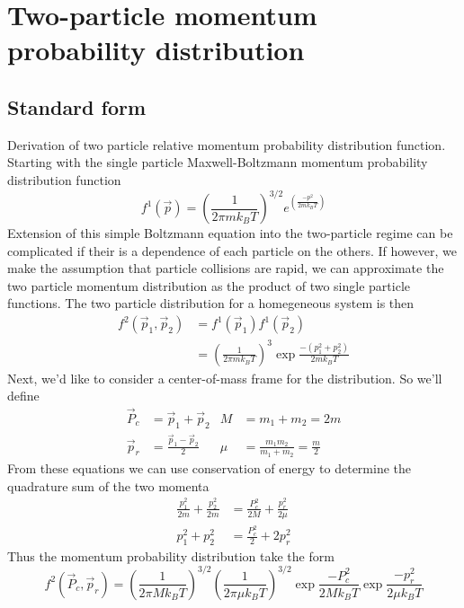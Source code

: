 \chapter{Two-particle momentum probability distribution} \label{app:momDistDer}

\section{Standard form} \label{sec:standardDist}
Derivation of two particle relative momentum probability distribution function.
Starting with the single particle Maxwell-Boltzmann momentum probability distribution function
\begin{equation} 
\label{eq:single_particle_prob}
		 f^1( \vec{p} ) = \left(\frac{1}{2 \pi m k_B T}\right)^{3/2} e^{\left(\frac{-p^2}{2 m k_B T}\right)}
\end{equation}
Extension of this simple Boltzmann equation into the two-particle regime can be complicated if their is a dependence of each particle on the others. 
If however, we make the assumption that particle collisions are rapid, we can approximate the two particle momentum distribution as the product of two single particle functions. 
The two particle distribution for a homegeneous system is then
\begin{equation}
\label{eq:two_particle_prob}
\begin{split}
		 f^2( \vec{p}_1, \vec{p}_2 ) &= f^1( \vec{p}_1 ) f^1( \vec{p}_2 ) \\
		  &= \left(\frac{1}{2 \pi m k_B T}\right)^3 \exp{\frac{-(p_1^2 + p_2^2)}{2 m k_B T}}
\end{split}
\end{equation}
Next, we'd like to consider a center-of-mass frame for the distribution. So we'll define
\begin{align*}
	\vec{P}_c & = \vec{p}_1 + \vec{p}_2             &	M   &= m_1 + m_2 = 2m \\
	\vec{p}_r & = \frac{\vec{p}_1 - \vec{p}_2}{2}   &   \mu &= \frac{m_1 m_2}{m_1 + m_2} = \frac{m}{2}
\end{align*}
From these equations we can use conservation of energy to determine the quadrature sum of the two momenta
\begin{align*}
	\frac{p_1^2}{2m} + \frac{p_2^2}{2m} &= \frac{P_c^2}{2M} + \frac{p_r^2}{2\mu} \\
	p_1^2 + p_2^2 &= \frac{P_c^2}{2} + 2 p_r^2
\end{align*}
Thus the momentum probability distribution take the form
\begin{equation} \label{eq:two_particle_prob_inf_atomFrame}
		 f^2( \vec{P}_c, \vec{p}_r ) = \left(\frac{1}{2 \pi M k_B T}\right)^{3/2} \left(\frac{1}{2 \pi \mu k_B T}\right)^{3/2} 
		 \exp{\frac{-P_c^2}{2 M k_B T}} \exp{\frac{-p_r^2}{2 \mu k_B T}}
\end{equation}

